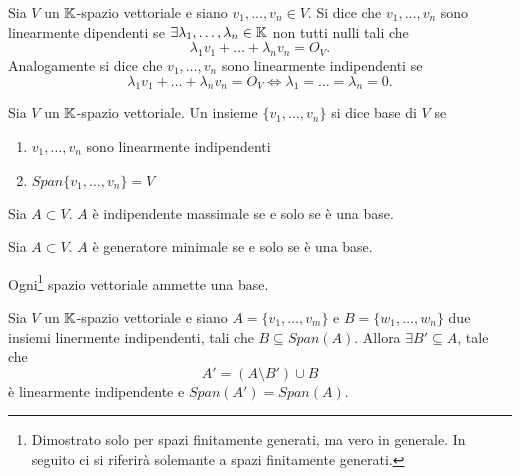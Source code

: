 \begin{definition} 
	Sia $ V $ un $ \mathbb{K} $-spazio vettoriale e siano $ v_1, \ldots , v_n \in V $. Si dice che $ v_1, \ldots, v_n $ 
	sono linearmente dipendenti se $ \exists \lambda_1, \ldots , \lambda_n \in \mathbb{K} $ non tutti nulli tali che 
	\[\lambda_1 v_1 + \ldots + \lambda_n v_n = O_V.\] Analogamente si dice che $ v_1, \ldots, v_n $ sono linearmente 
	indipendenti se \[\lambda_1 v_1 + \ldots + \lambda_n v_n = O_V \iff \lambda_1 = \ldots = \lambda_n = 0.\]	
\end{definition}

\begin{definition}[Base]
	Sia $ V $ un $ \mathbb{K} $-spazio vettoriale. Un insieme $ \{v_1, \ldots, v_n\} $ si dice base di $ V $ se
	\begin{enumerate}[label=(\roman*)]
		\item $ v_1, \ldots, v_n $ sono linearmente indipendenti
		\item $ Span\{v_1, \ldots , v_n\} = V $
	\end{enumerate}
\end{definition}


\begin{lemma}
	Sia $A \subset V$. $A$ è indipendente massimale se e solo se è una base. 
\end{lemma}

\begin{lemma}
        Sia $A \subset V$. $A$ è generatore minimale se e solo se è una base.
\end{lemma}

\begin{thm}
	Ogni\footnote{Dimostrato solo per spazi finitamente generati, ma vero in generale. In seguito ci si riferirà solemante a spazi finitamente generati.} 
	spazio vettoriale ammette una base.
\end{thm}

\begin{lemma}
	Sia $ V $ un $ \mathbb{K} $-spazio vettoriale e siano $ A = \{v_1, \ldots, v_m\} $ e $ B = \{  w_1, \ldots, w_n \} $ due insiemi linermente indipendenti,
	tali che $ B \subseteq Span(A) $. Allora $\exists B' \subseteq A $, tale che
	\[ A' = \left ( A \setminus B' \right ) \cup B \] è linearmente indipendente e $Span(A') = Span(A)$. 
\end{lemma}

